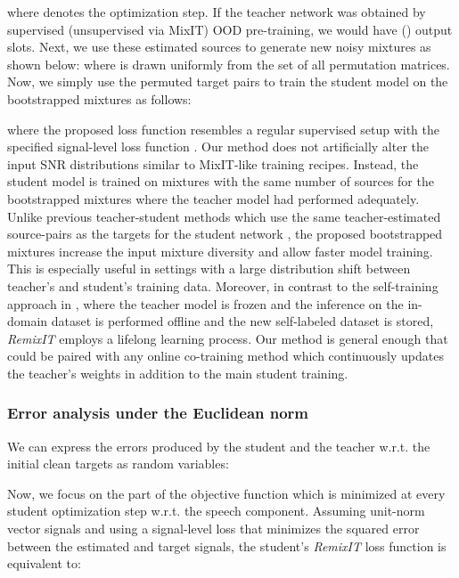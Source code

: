 \documentclass{article}
\begin{document}
where  denotes the optimization step. If the teacher network was obtained by supervised (unsupervised via MixIT) OOD pre-training, we would have  () output slots. Next, we use these estimated sources to generate new noisy mixtures as shown below:
 where  is drawn uniformly from the set of all  permutation matrices. Now, we simply use the permuted target pairs to train the student model  on the bootstrapped mixtures  as follows:

where the proposed loss function resembles a regular supervised setup with the specified signal-level loss function . Our method does not artificially alter the input SNR distributions similar to MixIT-like \cite{mixit,fujimura2021noisyTargetTRaining,saito2021trainingSEsystemsWNoisyDatasets} training recipes. Instead, the student model is trained on mixtures with the same number of sources for the bootstrapped mixtures where the teacher model had performed adequately. Unlike previous teacher-student methods which use the same teacher-estimated source-pairs as the targets for the student network \cite{zhang2021teacher,zeroshot_testTimeAdaptationSE}, the proposed bootstrapped mixtures increase the input mixture diversity and allow faster model training. This is especially useful in settings with a large distribution shift between teacher's and student's training data. Moreover, in contrast to the self-training approach in \cite{wang2021semiSupSingVoiceSepNoisySelfTraining}, where the teacher model is frozen and the inference on the in-domain dataset  is performed offline and the new self-labeled dataset is stored, \textit{RemixIT} employs a lifelong learning process. Our method is general enough that could be paired with any online co-training method which continuously updates the teacher's weights in addition to the main student training.



\subsubsection{Error analysis under the Euclidean norm}
\label{sec:remix_method:remixit:error_analysis}
We can express the errors produced by the student  and the teacher  w.r.t. the initial clean targets as random variables:

Now, we focus on the part of the objective function which is minimized at every student optimization step w.r.t. the speech component. Assuming unit-norm vector signals and using a signal-level loss  that minimizes the squared error between the estimated and target signals, the student's \textit{RemixIT} loss function is equivalent to:
\end{document}
